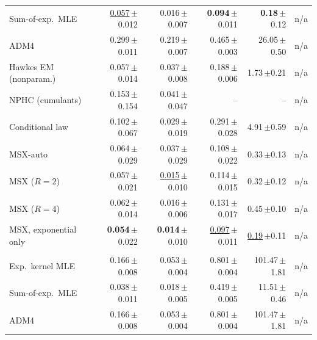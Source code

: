 \begin{tabular}{lrrrrr}
\quad Sum-of-exp.\ MLE & \underline{0.057}{\scriptsize\,$\pm$0.012} & 0.016{\scriptsize\,$\pm$0.007} & \textbf{0.094}{\scriptsize\,$\pm$0.011} & \textbf{0.18}{\scriptsize\,$\pm$0.12} & n/a \\
\quad ADM4 & 0.299{\scriptsize\,$\pm$0.011} & 0.219{\scriptsize\,$\pm$0.007} & 0.465{\scriptsize\,$\pm$0.003} & 26.05{\scriptsize\,$\pm$0.50} & n/a \\
\quad Hawkes EM (nonparam.) & 0.057{\scriptsize\,$\pm$0.014} & 0.037{\scriptsize\,$\pm$0.008} & 0.188{\scriptsize\,$\pm$0.006} & 1.73{\scriptsize\,$\pm$0.21} & n/a \\
\quad NPHC (cumulants) & 0.153{\scriptsize\,$\pm$0.154} & 0.041{\scriptsize\,$\pm$0.047} & -- & -- & n/a \\
\quad Conditional law & 0.102{\scriptsize\,$\pm$0.067} & 0.029{\scriptsize\,$\pm$0.019} & 0.291{\scriptsize\,$\pm$0.028} & 4.91{\scriptsize\,$\pm$0.59} & n/a \\
\rowcolor{oursbg} \quad MSX-auto & 0.064{\scriptsize\,$\pm$0.029} & 0.037{\scriptsize\,$\pm$0.029} & 0.108{\scriptsize\,$\pm$0.022} & 0.33{\scriptsize\,$\pm$0.13} & n/a \\
\rowcolor{oursbg} \quad MSX ($R=2$) & 0.057{\scriptsize\,$\pm$0.021} & \underline{0.015}{\scriptsize\,$\pm$0.010} & 0.114{\scriptsize\,$\pm$0.015} & 0.32{\scriptsize\,$\pm$0.12} & n/a \\
\rowcolor{oursbg} \quad MSX ($R=4$) & 0.062{\scriptsize\,$\pm$0.014} & 0.016{\scriptsize\,$\pm$0.006} & 0.131{\scriptsize\,$\pm$0.017} & 0.45{\scriptsize\,$\pm$0.10} & n/a \\
\rowcolor{oursbg} \quad MSX, exponential only & \textbf{0.054}{\scriptsize\,$\pm$0.022} & \textbf{0.014}{\scriptsize\,$\pm$0.010} & \underline{0.097}{\scriptsize\,$\pm$0.011} & \underline{0.19}{\scriptsize\,$\pm$0.11} & n/a \\
\addlinespace[3pt]\multicolumn{6}{l}{\textit{S3: hump}} \\[1pt]
\quad Exp.\ kernel MLE & 0.166{\scriptsize\,$\pm$0.008} & 0.053{\scriptsize\,$\pm$0.004} & 0.801{\scriptsize\,$\pm$0.004} & 101.47{\scriptsize\,$\pm$1.81} & n/a \\
\quad Sum-of-exp.\ MLE & 0.038{\scriptsize\,$\pm$0.011} & 0.018{\scriptsize\,$\pm$0.005} & 0.419{\scriptsize\,$\pm$0.005} & 11.51{\scriptsize\,$\pm$0.46} & n/a \\
\quad ADM4 & 0.166{\scriptsize\,$\pm$0.008} & 0.053{\scriptsize\,$\pm$0.004} & 0.801{\scriptsize\,$\pm$0.004} & 101.47{\scriptsize\,$\pm$1.81} & n/a \\

\end{tabular}
